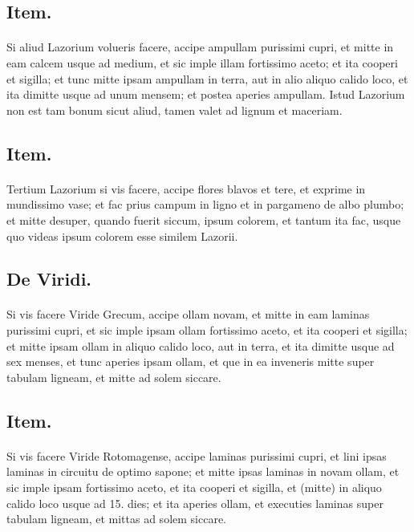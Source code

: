 \documentclass[a4paper, 11pt, oneside, polutonikogreek, italian]{article}
\begin{document}
\subsection{Item.}
\paragraph{}
Si aliud Lazorium volueris facere, accipe ampullam purissimi cupri, et mitte in eam calcem usque ad medium, et sic imple illam fortissimo aceto; et ita cooperi et sigilla; et tunc mitte ipsam ampullam in terra, aut in alio aliquo calido loco, et ita dimitte usque ad unum mensem; et postea aperies ampullam. Istud Lazorium non est tam bonum sicut aliud, tamen valet ad lignum et maceriam.

\subsection{Item.}
\paragraph{}
Tertium Lazorium si vis facere, accipe flores blavos et tere, et exprime in mundissimo vase; et fac prius campum in ligno et in pargameno de albo plumbo; et mitte desuper, quando fuerit siccum, ipsum colorem, et tantum ita fac, usque quo videas ipsum colorem esse similem Lazorii.

\subsection{De Viridi.}
\paragraph{}
Si vis facere Viride Grecum, accipe ollam novam, et mitte in eam laminas purissimi cupri, et sic imple ipsam ollam fortissimo aceto, et ita cooperi et sigilla; et mitte ipsam ollam in aliquo calido loco, aut in terra, et ita dimitte usque ad sex menses, et tunc aperies ipsam ollam, et que in ea inveneris mitte super tabulam ligneam, et mitte ad solem siccare.

\subsection{Item.}
\paragraph{}
Si vis facere Viride Rotomagense, accipe laminas purissimi cupri, et lini ipsas laminas in circuitu de optimo sapone; et mitte ipsas laminas in novam ollam, et sic imple ipsam fortissimo aceto, et ita cooperi et sigilla, et (mitte) in aliquo calido loco usque ad 15. dies; et ita aperies ollam, et executies laminas super tabulam ligneam, et mittas ad solem siccare.
\end{document}
